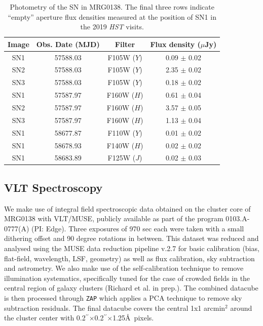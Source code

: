 \documentclass[12pt,dvipsnames]{article}
\gdef\arcsec{$^{\prime\prime}$}
\begin{document}
\begin{table}[h]
\centering
\begin{tabular}{cccc}
Image & Obs. Date (MJD) & Filter & Flux density ($\mu$Jy) \\
\midrule
SN1 & 57588.03 & F105W ($Y$) & 0.09  $\pm$ 0.02 \\
SN2 & 57588.03 & F105W ($Y$) & 2.35  $\pm$ 0.02 \\
SN3 & 57588.03 & F105W ($Y$) & 0.18  $\pm$ 0.02 \\
SN1 & 57587.97 & F160W ($H$) & 0.61  $\pm$ 0.04 \\
SN2 & 57587.97 & F160W ($H$) & 3.57  $\pm$ 0.05 \\
SN3 & 57587.97 & F160W ($H$) & 1.13  $\pm$ 0.04 \\
\midrule
SN1 & 58677.87 & F110W ($Y$) & 0.01  $\pm$ 0.02 \\
SN1 & 58678.93 & F140W ($H$) & 0.02  $\pm$ 0.02 \\
SN1 & 58683.89 & F125W ($J$) & 0.02  $\pm$ 0.03 \\
\end{tabular}
\caption{Photometry of the SN in MRG0138.  The final three rows indicate ``empty'' aperture flux densities measured at the position of SN1 in the 2019 \textit{HST} visits.
\label{tab:photometry}}
\end{table}

\subsection*{VLT Spectroscopy}
\label{sec:vltmuse}

We make use of integral field spectroscopic data obtained on the cluster core of MRG0138 with VLT/MUSE, publicly 
available as part of the program 0103.A-0777(A) (PI: Edge). Three exposures of 970 sec each were taken with a small dithering offset and 90 degree rotations in between. This dataset was reduced and analysed using the MUSE data reduction pipeline v.2.7 \cite{weilbacher_data_2020} for basic calibration (bias, flat-field, wavelength, LSF, geometry) as well as flux calibration, sky subtraction and astrometry. We  also make use of the self-calibration technique \cite{bacon_muse_2017}  to remove illumination systematics, specifically tuned for the case of crowded fields in the central region of galaxy clusters (Richard et al. in prep.). The combined datacube is then processed through {\tt ZAP} \cite{soto_zap_2016} which applies a PCA technique to remove sky subtraction residuals. The final datacube covers the central 1x1 arcmin$^2$ around the cluster center with 0.2\arcsec$\times$0.2\arcsec$\times$1.25\AA\ pixels.
\end{document}
